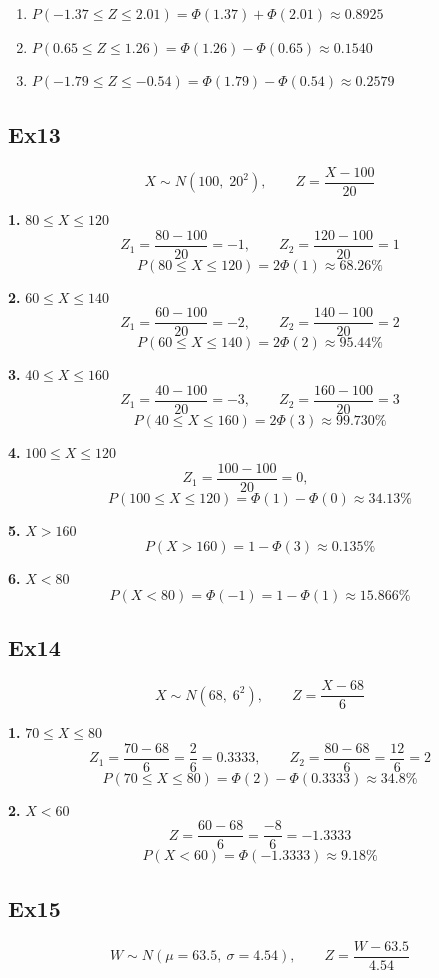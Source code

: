 \documentclass[12pt, a4paper]{article}
\begin{document}
\begin{enumerate}
\item $P( -1.37 \leq Z \leq 2.01 ) = \Phi(1.37) + \Phi(2.01) \approx  0.8925$
\item $P( 0.65 \leq Z \leq 1.26 ) = \Phi(1.26) - \Phi(0.65) \approx  0.1540$
\item $P( -1.79 \leq Z \leq -0.54 ) = \Phi(1.79) - \Phi(0.54) \approx 0.2579 $
\end{enumerate}


\subsection*{ Ex13 }
\[
X \sim N(100, \; 20^2), \qquad Z = \frac{X-100}{20}
\]

\textbf{1. }$80 \le X \le 120$
\[
Z_1=\frac{80-100}{20}=-1,\qquad
Z_2=\frac{120-100}{20}=1
\]
\[
P(80\le X\le120)=2\Phi(1) \approx 68.26 \%
\]

\textbf{2. } $60 \le X \le 140$
\[
Z_1=\frac{60-100}{20}=-2,\qquad
Z_2=\frac{140-100}{20}=2
\]
\[
P(60\le X\le140) = 2\Phi(2) \approx 95.44 \%
\]

\textbf{3. } $40 \le X \le 160$
\[
Z_1=\frac{40-100}{20}=-3,\qquad
Z_2=\frac{160-100}{20}=3
\]
\[
P(40\le X\le160)= 2\Phi(3) \approx 99.730 \%
\]

\textbf{4. } $100 \le X \le 120$
\[
Z_1=\frac{100-100}{20}=0,\qquad
\]
\[
P(100\le X\le120)=\Phi(1)-\Phi(0) \approx 34.13 \%
\]

\textbf{5. } $X > 160$
\[
P(X>160)=1-\Phi(3) \approx 0.135 \%
\]

\textbf{6. } $X < 80$
\[
P(X<80)=\Phi(-1)=1-\Phi(1) \approx 15.866\%
\]

\subsection*{ Ex14 }
\[
X \sim N(68,\;6^2),\qquad
Z=\frac{X-68}{6}
\]

\textbf{1. } $70 \le X \le 80$
\[
Z_1=\frac{70-68}{6}=\frac{2}{6}=0.3333,\qquad
Z_2=\frac{80-68}{6}=\frac{12}{6}=2
\]
\[
P(70\le X\le80)=\Phi(2)-\Phi(0.3333) \approx 34.8 \%
\]

\textbf{2. } $X < 60$
\[
Z = \frac{60 - 68}{6} = \frac{-8}{6} = -1.3333
\]
\[
P(X<60)=\Phi(-1.3333) \approx 9.18 \%
\]

\subsection*{ Ex15 }
\[
W \sim N(\mu=63.5,\ \sigma=4.54),\qquad Z=\frac{W-63.5}{4.54}
\]
\end{document}
